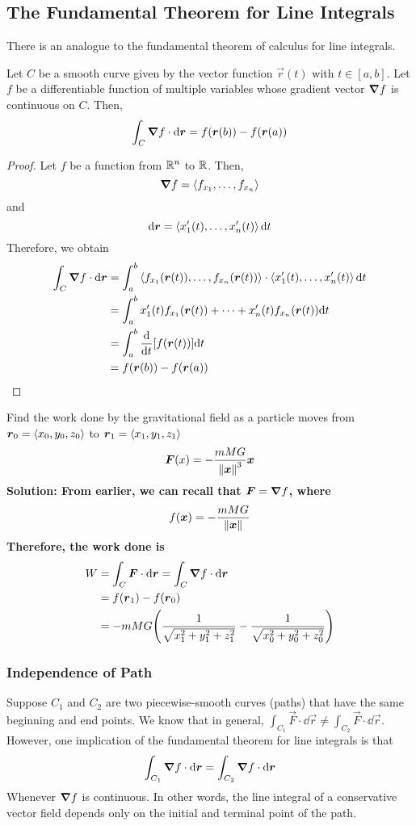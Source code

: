 \subsection{The Fundamental Theorem for Line Integrals}
There is an analogue to the fundamental theorem of calculus for line integrals. 
\begin{definition}
    Let $C$ be a smooth curve given by the vector function $\vec r(t)$ with $t\in[a,b]$. Let $f$ be a differentiable function of multiple variables whose gradient vector $\boldsymbol\nabla f$ is continuous on $C$. Then,
    \[ \int_C \boldsymbol\nabla f \cdot \dd \boldsymbol{r} = f(\boldsymbol{r}(b)) - f(\boldsymbol{r}(a)) \]
\end{definition}
\begin{proof}
    Let $f$ be a function from $\mathbb{R}^n$ to $\mathbb{R}$. Then, 
    \[ \boldsymbol\nabla f = \left\langle f_{x_1}, \dots, f_{x_n} \right\rangle\]
    and 
    \[ \dd \boldsymbol{r} = \left\langle x_1'(t), \dots, x_n'(t)\right\rangle\dd t\]
    Therefore, we obtain
    \begin{align*}
        \int_C \bnabla f \cdot \dd \vec r &= \int_a^b \< f_{x_1}(\vec r(t)), \dots, f_{x_n}(\vec r(t)) \> \cdot  \< x_1'(t), \dots, x_n'(t)\>\dd t \\
        &= \int_a^b x_1'(t)f_{x_1}(\vec r(t)) + \dots + x_n'(t)f_{x_n}(\vec r(t)) \dd t \\
        &= \int_a^b \dv{t}\bqty{f(\vec r(t))} \dd t \\
        &= f(\vec r(b)) - f(\vec r(a))
    \end{align*}
\end{proof}
\begin{example}
    Find the work done by the gravitational field as a particle moves from $\boldsymbol{r}_0 = \left\langle x_0, y_0, z_0\right\rangle$ to $\boldsymbol{r}_1 = \left\langle x_1, y_1, z_1\right\rangle$
    \[ \boldsymbol{F}(x) = -\frac{mMG}{\norm{\boldsymbol{x}}^3}\boldsymbol{x}\]
    \bf{Solution: }From earlier, we can recall that $\boldsymbol{F} = \boldsymbol\nabla f$, where
    \[f(\boldsymbol{x}) = -\frac{mMG}{\norm{\boldsymbol{x}}}\]
    Therefore, the work done is 
    \begin{align*}
        W &= \int_C \vec F \cdot \dd\vec r = \int_C \bnabla f \cdot \dd \vec r \\
        &= f(\vec r_1) - f(\vec r_0) \\
        &= -mMG\pqty{\frac{1}{\sqrt{x_1^2+y_1^2+z_1^2}}-\frac{1}{\sqrt{x_0^2+y_0^2+z_0^2}}}
    \end{align*}
\end{example}
\subsubsection{Independence of Path}
Suppose $C_1$ and $C_2$ are two piecewise-smooth curves (paths) that have the same beginning and end points. We know that in general, $\int_{C_1}\vec F \cdot \dd \vec r \neq \int_{C_2} \vec F \cdot \dd \vec r$. However, one implication of the fundamental theorem for line integrals is that
\[ \int_{C_1} \boldsymbol\nabla f \cdot \dd \boldsymbol{r} = \int_{C_2} \boldsymbol\nabla f \cdot \dd \boldsymbol{r}\]
Whenever $\boldsymbol\nabla f$ is continuous. In other words, the line integral of a conservative vector field depends only on the initial and terminal point of the path. \par
